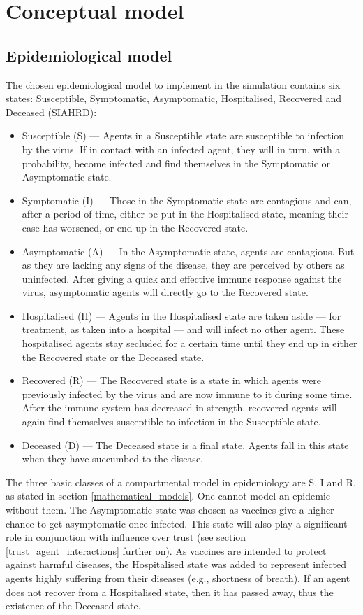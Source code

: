 \chapter{Conceptual model}

\section{Epidemiological model}
\label{concept_epidemiological_model}

The chosen epidemiological model to implement in the simulation contains six states: Susceptible, Symptomatic, Asymptomatic, Hospitalised, Recovered and Deceased (SIAHRD):
\begin{itemize}
    \item Susceptible (S) --- Agents in a Susceptible state are susceptible to infection by the virus. If in contact with an infected agent, they will in turn, with a probability, become infected and find themselves in the Symptomatic or Asymptomatic state.
    \item Symptomatic (I) --- Those in the Symptomatic state are contagious and can, after a period of time, either be put in the Hospitalised state, meaning their case has worsened, or end up in the Recovered state.
    \item Asymptomatic (A) --- In the Asymptomatic state, agents are contagious. But as they are lacking any signs of the disease, they are perceived by others as uninfected. After giving a quick and effective immune response against the virus, asymptomatic agents will directly go to the Recovered state.
    \item Hospitalised (H) --- Agents in the Hospitalised state are taken aside --- for treatment, as taken into a hospital --- and will infect no other agent. These hospitalised agents stay secluded for a certain time until they end up in either the Recovered state or the Deceased state.
    \item Recovered (R) --- The Recovered state is a state in which agents were previously infected by the virus and are now immune to it during some time. After the immune system has decreased in strength, recovered agents will again find themselves susceptible to infection in the Susceptible state.
    \item Deceased (D) --- The Deceased state is a final state. Agents fall in this state when they have succumbed to the disease.
\end{itemize}

The three basic classes of a compartmental model in epidemiology are S, I and R, as stated in section \ref{mathematical_models}. One cannot model an epidemic without them. The Asymptomatic state was chosen as vaccines give a higher chance to get asymptomatic once infected. This state will also play a significant role in conjunction with influence over trust (see section \ref{trust_agent_interactions} further on). As vaccines are intended to protect against harmful diseases, the Hospitalised state was added to represent infected agents highly suffering from their diseases (e.g., shortness of breath). If an agent does not recover from a Hospitalised state, then it has passed away, thus the existence of the Deceased state.

